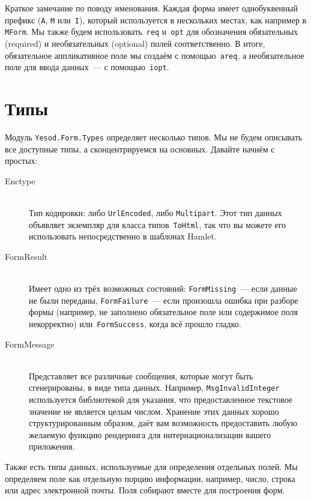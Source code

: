 Краткое замечание по поводу именования. Каждая форма имеет однобуквенный
префикс (\texttt{A}, \texttt{M} или~\texttt{I}), который используется в
нескольких местах, как например в \lstinline'MForm'. Мы также будем
использовать~\lstinline'req' и~\lstinline'opt' для обозначения обязательных
(required) и необязательных (optional) полей соответственно. В итоге,
обязательное аппликативное поле мы создаём с помощью~\lstinline'areq', а
необязательное поле для ввода данных~--- с помощью~\lstinline'iopt'.

\section{Типы}
Модуль \texttt{Yesod.Form.Types} определяет несколько типов. Мы не будем
описывать все доступные типы, а сконцентрируемся на основных. Давайте начнём с
простых:
\begin{description}
    \item[Enctype] \hfill \\
        Тип кодировки: либо \lstinline'UrlEncoded', либо \lstinline'Multipart'.
        Этот тип данных объявляет экземпляр для класса
        типов~\lstinline'ToHtml', так что вы можете его использовать
        непосредственно в шаблонах Hamlet.

    \item[FormResult] \hfill \\
        Имеет одно из трёх возможных состояний: \lstinline'FormMissing'~---
        если данные не были переданы, \lstinline'FormFailure'~--- если
        произошла ошибка при разборе формы (например, не заполнено обязательное
        поле или содержимое поля некорректно) или~\lstinline'FormSuccess',
        когда всё прошло гладко.

    \item[FormMessage] \hfill \\
        Представляет все различные сообщения, которые могут быть сгенерированы,
        в виде типа данных. Например, \lstinline'MsgInvalidInteger'
        используется библиотекой для указания, что предоставленное текстовое
        значение не является целым числом. Хранение этих данных хорошо
        структурированным образом, даёт вам возможность предоставить любую
        желаемую функцию рендеринга для интернационализации вашего приложения.
\end{description}

Также есть типы данных, используемые для определения отдельных полей. Мы
определяем поле как отдельную порцию информации, например, число, строка или
адрес электронной почты. Поля собирают вместе для построения форм.

